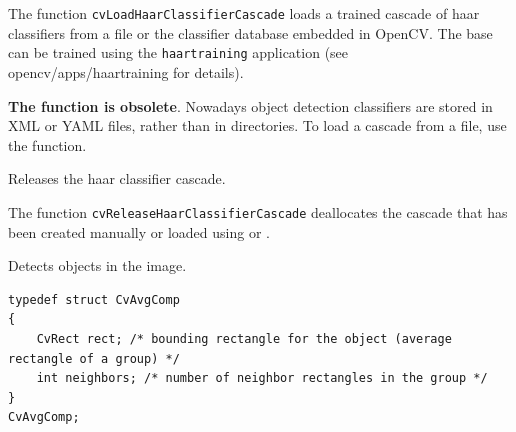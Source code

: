 The function \texttt{cvLoadHaarClassifierCascade} loads a trained cascade
of haar classifiers from a file or the classifier database embedded in
OpenCV. The base can be trained using the \texttt{haartraining} application
(see opencv/apps/haartraining for details).

\textbf{The function is obsolete}. Nowadays object detection classifiers are stored in XML or YAML files, rather than in directories. To load a cascade from a file, use the  function.

\label{ReleaseHaarClassifierCascade}

Releases the haar classifier cascade.


\begin{description}
\end{description}

The function \texttt{cvReleaseHaarClassifierCascade} deallocates the cascade that has been created manually or loaded using  or .

\label{HaarDetectObjects}

Detects objects in the image.

\begin{lstlisting}
typedef struct CvAvgComp
{
    CvRect rect; /* bounding rectangle for the object (average rectangle of a group) */
    int neighbors; /* number of neighbor rectangles in the group */
}
CvAvgComp;
\end{lstlisting}


